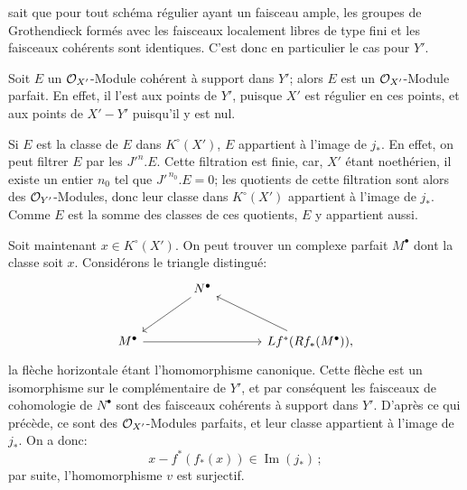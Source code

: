 sait que pour tout schéma régulier ayant un faisceau ample, les groupes de Grothendieck formés avec les faisceaux localement libres de type fini et les faisceaux cohérents sont identiques. C'est donc en particulier le cas pour \(Y'\).

Soit \(E\) un \(\cO_{X'}\)-Module cohérent à support dans \(Y'\); alors \(E\) est un \(\cO_{X'}\)-Module parfait. En effet, il l'est aux points de \(Y'\), puisque \(X'\) est régulier en ces points, et aux points de \(X'-Y'\) puisqu'il y est nul.

Si \(E\) est la classe de \(E\) dans \(K^\circ(X')\), \(E\) appartient à l'image de \(j_*\). En effet, on peut filtrer \(E\) par les \(J'^n.E\). Cette filtration est finie, car, \(X'\) étant noethérien, il existe un entier \(n_0\) tel que \(J'^{\,n_0}.E=0\); les quotients de cette filtration sont alors des \(\cO_{Y'}\)-Modules, donc leur classe dans \(K^\circ(X')\) appartient à l'image de \(j_*\). Comme \(E\) est la somme des classes de ces quotients, \(E\) y appartient aussi.

Soit maintenant \(x\in K^\circ(X')\). On peut trouver un complexe parfait \(M^\bullet\) dont la classe soit \(x\). Considérons le triangle distingué:
\[
\begin{tikzcd}[column sep=large,row sep=large]
& N^\bullet \arrow[dl] &\\
M^\bullet \arrow[rr] && Lf^*(Rf_*(M^\bullet)) \arrow[ul] ,
\end{tikzcd}
\]
la flèche horizontale étant l'homomorphisme canonique. Cette flèche est un isomorphisme sur le complémentaire de \(Y'\), et par conséquent les faisceaux de cohomologie de \(N^\bullet\) sont des faisceaux cohérents à support dans \(Y'\). D'après ce qui précède, ce sont des \(\cO_{X'}\)-Modules parfaits, et leur classe appartient à l'image de \(j_*\). On a donc:
\[
x-f^*(f_*(x))\in\operatorname{Im}(j_*)\,;
\]
par suite, l'homomorphisme \(v\) est surjectif.



\providecommand{\Q}{\mathbb Q}
\providecommand{\bfP}{\mathbf P}
\providecommand{\gr}{\operatorname{gr}}
\providecommand{\Id}{\operatorname{Id}}
\providecommand{\Fil}{\operatorname{Fil}}
\providecommand{\Imf}{\operatorname{Im}}
\providecommand{\rank}{\operatorname{rank}}
\providecommand{\codim}{\operatorname{codim}}
\providecommand{\cJ}{\mathcal J}
\providecommand{\cI}{\mathcal I}
\providecommand{\cN}{\mathcal N}
\providecommand{\cE}{\mathcal E}
\providecommand{\cO}{\mathcal O}


